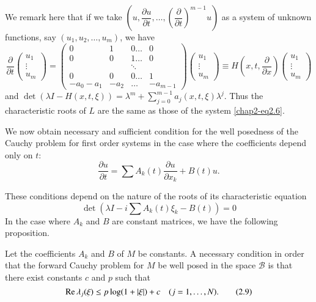 We remark here that if we take $\left(u, \dfrac{\partial  u}{\partial  t},
\ldots,  \left(\dfrac{\partial }{\partial t}\right)^{m-1}u\right) $ as
a system of unknown functions,  say $(u_1,  u_2,  \ldots,  u_m)$,  we have  
\begin{equation}
\frac{\partial}{\partial  t}\begin{pmatrix}u_1 \\ \vdots
  \\ u_m \end{pmatrix} = \begin{pmatrix} 0 & 1 & 0 \ldots & 0\\ 0 & 0
  & 1 \ldots & 0\\  & & \ddots & \\  0 & 0 & 0 \ldots & 1\\ -a_0  -a_1
  & -a_2 & \ldots & -a_{m-1} \end{pmatrix} \begin{pmatrix}u_1
  \\ \vdots \\ u_m \end{pmatrix} \equiv H\left(x, t,
\frac{\partial}{\partial x}\right) \begin{pmatrix}u_1 \\ \vdots
  \\ u_m \end{pmatrix}\tag{2.6}\label{chap2-eq2.6}   
\end{equation}
and $\det (\lambda I - H(x, t, \xi)) = \lambda^m + \sum^{m-1}_{j=0}
a_j (x, t, \xi) \lambda^j$. Thus the characteristic roots of $L$ are
the same as those of the system \eqref{chap2-eq2.6}.  

We now obtain necessary and sufficient condition for the well
posedness of the Cauchy problem for first order systems in the case
where the coefficients depend only on $t$:  
\begin{equation}
\frac{\partial u}{\partial t} = \sum A_k (t) \frac{\partial
  u}{\partial  x_k} + B( t ) u. \tag{2.7}\label{chap2-eq2.7}   
\end{equation}

These conditions depend on the nature of the roots of its
characteristic equation   
\begin{equation}
\det (\lambda I - i \sum A_k (t) \xi_k - B(t)) = 0
\tag{2.8}\label{chap2-eq2.8}    
\end{equation}
In the case where $A_k$ and $ B$ are constant matrices, we have the
following proposition. 

\setcounter{proposition}{0}
\begin{proposition}[Hadamard]\label{chap2-sec2-prop1} %
 Let the coefficients $A_k$ and $B$ of $M$ be constants. A necessary
 condition in order that the forward Cauchy 
  problem for $M$ be well posed in the space $\mathscr{B}$ is that
  there exist constants $c$ and $p$ such that  
\begin{equation}
\operatorname{Re} \lambda _j (\xi ) \leq p  \log (1 + |\xi | ) + c \quad (j=1,  \ldots
,  N). \tag{2.9}\label{chap2-eq2.9}   
\end{equation}\pageoriginale
\end{proposition}

